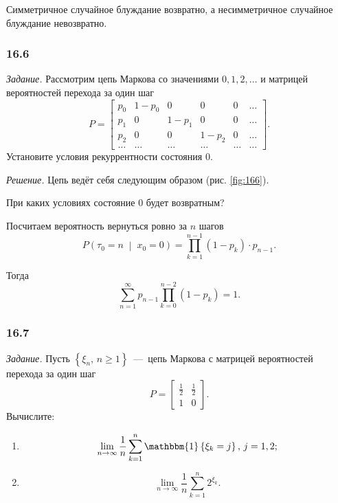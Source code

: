 Симметричное случайное блуждание возвратно,
а несимметричное случайное блуждание невозвратно.

\subsubsection*{16.6}

\textit{Задание.}
Рассмотрим цепь Маркова со значениями $0, 1, 2, \dotsc $
и матрицей вероятностей перехода за один шаг
\begin{equation*}
  P =
  \begin{bmatrix}
    p_0  & 1 - p_0 & 0       & 0       & 0    & \dotsc \\
    p_1  & 0       & 1 - p_1 & 0       & 0    & \dotsc \\
    p_2  & 0       & 0       & 1 - p_2 & 0    & \dotsc \\
    \dotsc & \dotsc    & \dotsc    & \dotsc    & \dotsc & \dotsc
  \end{bmatrix}.
\end{equation*}
Установите условия рекуррентности состояния 0.

\textit{Решение.}
Цепь ведёт себя следующим образом (рис. \ref{fig:166}).

При каких условиях состояние 0 будет возвратным?

Посчитаем вероятность вернуться ровно за $n$ шагов
\begin{equation*}
  P \left( \tau_0 = n \; \middle| \; x_0 = 0 \right) =
  \prod \limits_{k = 1}^{n - 1} \left( 1 - p_k \right) \cdot p_{n - 1}.
\end{equation*}

Тогда
\begin{equation*}
  \sum \limits_{n = 1}^{ \infty }
    p_{n - 1} \prod \limits_{k = 0}^{n - 2} \left( 1 - p_k \right) =
  1.
\end{equation*}

\subsubsection*{16.7}

\textit{Задание.}
Пусть $ \left\{ \xi_n, \, n \geq 1 \right\} $~---~цепь Маркова с матрицей
вероятностей перехода за один шаг
\begin{equation*}
  P =
  \begin{bmatrix}
    \frac{1}{2} & \frac{1}{2} \\
    1           & 0
  \end{bmatrix}.
\end{equation*}
Вычислите:
\begin{enumerate}[label=\alph*)]
  \item \begin{equation*}
    \lim \limits_{n \to \infty }
      \frac{1}{n} \sum \limits_{k = 1}^n \mathbbm{1} \left\{ \xi_k = j \right\},
    \, j = 1, 2;
  \end{equation*}
  \item \begin{equation*}
    \lim \limits_{n \to \infty } \frac{1}{n} \sum \limits_{k = 1}^n 2^{ \xi_k}.
  \end{equation*}
\end{enumerate}

